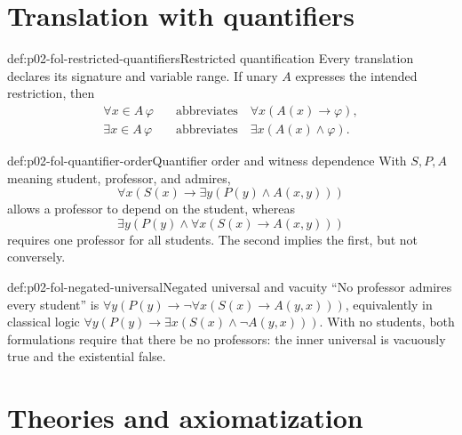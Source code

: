 \section{Translation with quantifiers}
\label{sec:p02-fol-translation}

\begin{hbconvention}{def:p02-fol-restricted-quantifiers}{Restricted quantification}
Every translation declares its signature and variable range.  If unary
\(A\) expresses the intended restriction, then
\[
\begin{aligned}
 \forall x\in A\,\varphi&\quad\text{abbreviates}\quad
 \forall x(A(x)\to\varphi),\\
 \exists x\in A\,\varphi&\quad\text{abbreviates}\quad
 \exists x(A(x)\land\varphi).
\end{aligned}
\]
\end{hbconvention}

\begin{hbexample}{def:p02-fol-quantifier-order}{Quantifier order and witness dependence}
With \(S,P,A\) meaning student, professor, and admires,
\[
 \forall x(S(x)\to\exists y(P(y)\land A(x,y)))
\]
allows a professor to depend on the student, whereas
\[
 \exists y(P(y)\land\forall x(S(x)\to A(x,y)))
\]
requires one professor for all students.  The second implies the first, but
not conversely.
\end{hbexample}

\begin{hbexample}{def:p02-fol-negated-universal}{Negated universal and vacuity}
``No professor admires every student'' is
\(\forall y(P(y)\to\neg\forall x(S(x)\to A(y,x)))\), equivalently in
classical logic
\(\forall y(P(y)\to\exists x(S(x)\land\neg A(y,x)))\).  With no students,
both formulations require that there be no professors: the inner universal
is vacuously true and the existential false.
\end{hbexample}

\section{Theories and axiomatization}
\label{sec:p02-fol-theories}

